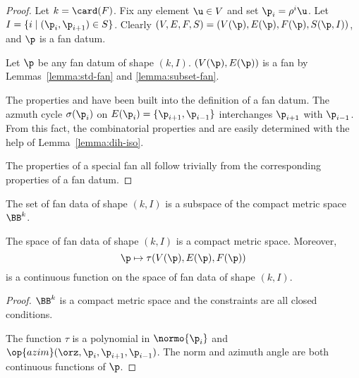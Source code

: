 \begin{proof}
  Let $k=\card(F)$.  Fix any element $\u\in V$ and
set $\p_i = \rho^i \u$.  Let $I = \{i\mid (\p_i,\p_{i+1}) \in S\}$.
Clearly $(V,E,F,S)=(V(\p),E(\p),F(\p),S(\p,I))$, and $\p$ is a fan
datum.

Let $\p$ be any fan datum of shape $(k,I)$.
$(V(\p),E(\p))$
is a fan by Lemmas~\ref{lemma:std-fan} and \ref{lemma:subset-fan}.


 The properties
 and  have been built into the definition of a
fan datum.  The azmuth cycle $\sigma(\p_i)$ on $E(\p_i) =
\{\p_{i+1},\p_{i-1}\}$ interchanges $\p_{i+1}$ with $\p_{i-1}$.  From
this fact, the combinatorial properties  and
 are easily determined with the help of
Lemma~\ref{lemma:dih-iso}.

 The properties
of a special fan all follow trivially from the corresponding
properties of a fan datum.
\end{proof}

The set of fan data of shape $(k,I)$ is a subspace of the compact metric
space $\BB^k$.


\begin{lemma}\label{lemma:compact-fan}
The space of fan data of shape $(k,I)$ is a compact metric space.
Moreover,
\begin{displaymath}
\p \mapsto \tau(V(\p),E(\p),F(\p))
\end{displaymath}
is a continuous function on the space of fan data of shape $(k,I)$.
\end{lemma}

\begin{proof} $\BB^k$ is a compact metric space and the constraints
are all closed conditions.

The function $\tau$ is a polynomial in $\normo{\p_i}$ and
$\op{azim}(\orz,\p_i,\p_{i+1},\p_{i-1})$.  The norm and azimuth
angle are both continuous functions of $\p$.
\end{proof}




